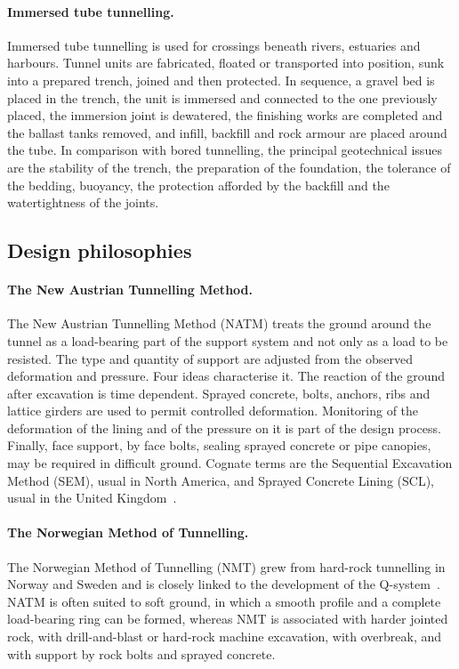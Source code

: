 \paragraph{Immersed tube tunnelling.}
\label{sec:immersed-tube}
Immersed tube tunnelling is used for crossings beneath rivers, estuaries and
harbours. Tunnel units are fabricated, floated or transported into position,
sunk into a prepared trench, joined and then protected. In sequence, a gravel
bed is placed in the trench, the unit is immersed and connected to the one
previously placed, the immersion joint is dewatered, the finishing works are
completed and the ballast tanks removed, and infill, backfill and rock armour
are placed around the tube. In comparison with bored tunnelling, the principal
geotechnical issues are the stability of the trench, the preparation of the
foundation, the tolerance of the bedding, buoyancy, the protection afforded
by the backfill and the watertightness of the joints.

\subsection{Design philosophies}
\label{sec:design-philosophies}

\paragraph{The New Austrian Tunnelling Method.}
\label{sec:natm}
The New Austrian Tunnelling Method (NATM) treats the ground around the tunnel
as a load-bearing part of the support system and not only as a load to be
resisted. The type and quantity of support are adjusted from the
observed deformation and pressure. Four ideas characterise it. The reaction
of the ground after excavation is time dependent. Sprayed concrete, bolts, anchors,
ribs and lattice girders are used to permit controlled deformation.
Monitoring of the deformation of the lining and of the pressure on it is part
of the design process. Finally, face support, by face bolts, sealing sprayed concrete or
pipe canopies, may be required in difficult ground. Cognate terms are the
Sequential Excavation Method (SEM), usual in North America, and Sprayed
Concrete Lining (SCL), usual in the United Kingdom~\citep{thomas2009scl}.

\paragraph{The Norwegian Method of Tunnelling.}
\label{sec:nmt}
The Norwegian Method of Tunnelling (NMT) grew from hard-rock tunnelling in
Norway and Sweden and is closely linked to the development of the
Q-system~\citep{barton1994qsystem}.
NATM is often suited to soft ground, in which a smooth profile and a complete
load-bearing ring can be formed, whereas NMT is associated with harder jointed rock,
with drill-and-blast or hard-rock machine excavation, with overbreak, and
with support by rock bolts and sprayed concrete.


